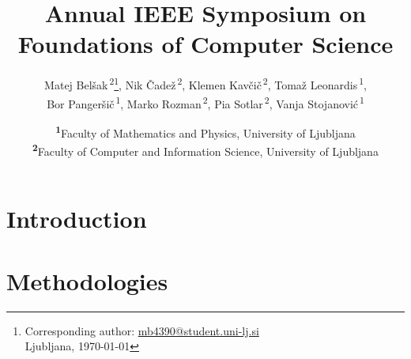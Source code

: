 \documentclass[
	a4paper, %
	10pt, %
	unnumberedsections, %
	twoside, %
]{LTJournalArticle}
\title{Annual IEEE Symposium on Foundations of Computer Science} %
\author{%
	Matej Bel\v sak\textsuperscript{\,2}\thanks{Corresponding author: \href{mailto:mb4390@student.uni-lj.si}{mb4390@student.uni-lj.si}\\ Ljubljana, \monthyeardate\today  }, 
	Nik \v Cade\v z\textsuperscript{\,2},
	Klemen Kav\v ci\v c\textsuperscript{\,2}, 
	Toma\v z Leonardis\textsuperscript{\,1},\\
	Bor Panger\v si\v c\textsuperscript{\,1}, 
	Marko Rozman\textsuperscript{\,2}, 
	Pia Sotlar\textsuperscript{\,2}, 
	Vanja Stojanovi\' c\textsuperscript{\,1}
}
\date{
	\footnotesize\textsuperscript{\textbf{1}}Faculty of Mathematics and Physics, University of Ljubljana\\
	\textsuperscript{\textbf{2}}Faculty of Computer and Information Science, University of Ljubljana
}
\begin{document}
\maketitle %


\section{Introduction}



\section{Methodologies}







\printbibliography %

\end{document}
